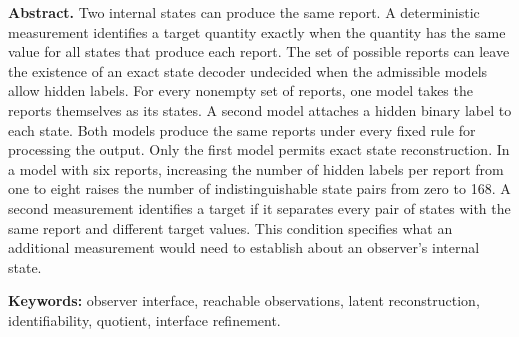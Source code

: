 \noindent\textbf{Abstract.}
Two internal states can produce the same report. A deterministic measurement identifies a target quantity exactly when the quantity has the same value for all states that produce each report. The set of possible reports can leave the existence of an exact state decoder undecided when the admissible models allow hidden labels. For every nonempty set of reports, one model takes the reports themselves as its states. A second model attaches a hidden binary label to each state. Both models produce the same reports under every fixed rule for processing the output. Only the first model permits exact state reconstruction. In a model with six reports, increasing the number of hidden labels per report from one to eight raises the number of indistinguishable state pairs from zero to 168. A second measurement identifies a target if it separates every pair of states with the same report and different target values. This condition specifies what an additional measurement would need to establish about an observer's internal state.

\medskip
\noindent\textbf{Keywords:} observer interface, reachable observations, latent reconstruction, identifiability, quotient, interface refinement.
